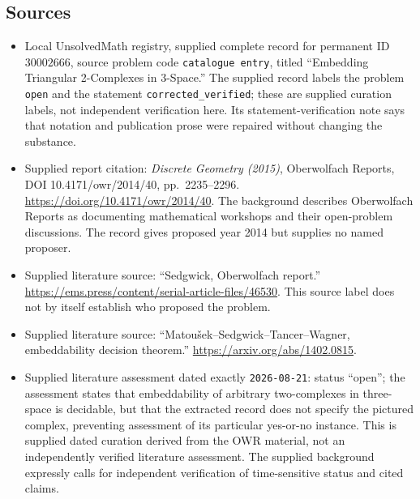 \documentclass[11pt]{article}
\begin{document}
\subsection{Sources}
\begin{itemize}
\item Local UnsolvedMath registry, supplied complete record for permanent ID \(30002666\), source problem code \texttt{catalogue entry}, titled ``Embedding Triangular 2-Complexes in 3-Space.'' The supplied record labels the problem \texttt{open} and the statement \texttt{corrected\_verified}; these are supplied curation labels, not independent verification here. Its statement-verification note says that notation and publication prose were repaired without changing the substance.
\item Supplied report citation: \emph{Discrete Geometry (2015)}, Oberwolfach Reports, DOI 10.4171/owr/2014/40, pp.~2235--2296. \url{https://doi.org/10.4171/owr/2014/40}. The background describes Oberwolfach Reports as documenting mathematical workshops and their open-problem discussions. The record gives proposed year 2014 but supplies no named proposer.
\item Supplied literature source: ``Sedgwick, Oberwolfach report.'' \url{https://ems.press/content/serial-article-files/46530}. This source label does not by itself establish who proposed the problem.
\item Supplied literature source: ``Matou\v{s}ek--Sedgwick--Tancer--Wagner, embeddability decision theorem.'' \url{https://arxiv.org/abs/1402.0815}.
\item Supplied literature assessment dated exactly \texttt{2026-08-21}: status ``open''; the assessment states that embeddability of arbitrary two-complexes in three-space is decidable, but that the extracted record does not specify the pictured complex, preventing assessment of its particular yes-or-no instance. This is supplied dated curation derived from the OWR material, not an independently verified literature assessment. The supplied background expressly calls for independent verification of time-sensitive status and cited claims.
\end{itemize}
\end{document}
